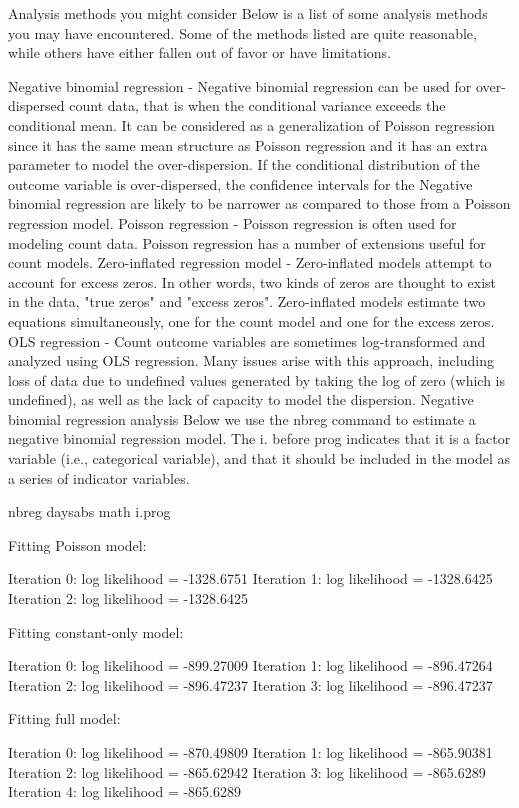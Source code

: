 Analysis methods you might consider
Below is a list of some analysis methods you may have encountered.  Some of the methods listed are quite reasonable, while others have either fallen out of favor or have limitations.  

Negative binomial regression - Negative binomial regression can be used for over-dispersed count data, that is when the conditional variance exceeds the conditional mean. It can be considered as a generalization of Poisson regression since it has the same mean structure as Poisson regression and it has an extra parameter to model the over-dispersion. If the conditional distribution of the outcome variable is over-dispersed, the confidence intervals for the Negative binomial regression are likely to be narrower as compared to those from a Poisson regression model.
Poisson regression - Poisson regression is often used for modeling count data. Poisson regression has a number of extensions useful for count models. 
Zero-inflated regression model - Zero-inflated models attempt to account for excess zeros.  In other words, two kinds of zeros are thought to exist in the data, "true zeros" and "excess zeros".  Zero-inflated models estimate two equations simultaneously, one for the count model and one for the excess zeros.
OLS regression - Count outcome variables are sometimes log-transformed and analyzed using OLS regression.  Many issues arise with this approach, including loss of data due to undefined values generated by taking the log of zero (which is undefined), as well as the lack of capacity to model the dispersion.
Negative binomial regression analysis
Below we use the nbreg command to estimate a negative binomial regression model.  The i. before prog indicates that it is a factor variable (i.e., categorical variable), and that it should be included in the model as a series of indicator variables.  

nbreg daysabs math i.prog

Fitting Poisson model:

Iteration 0:   log likelihood = -1328.6751 
Iteration 1:   log likelihood = -1328.6425 
Iteration 2:   log likelihood = -1328.6425 

Fitting constant-only model:

Iteration 0:   log likelihood = -899.27009 
Iteration 1:   log likelihood = -896.47264 
Iteration 2:   log likelihood = -896.47237 
Iteration 3:   log likelihood = -896.47237 

Fitting full model:

Iteration 0:   log likelihood = -870.49809 
Iteration 1:   log likelihood = -865.90381 
Iteration 2:   log likelihood = -865.62942 
Iteration 3:   log likelihood =  -865.6289 
Iteration 4:   log likelihood =  -865.6289 

